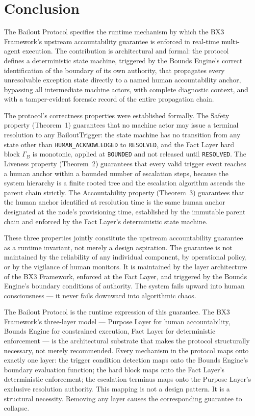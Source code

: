 \section{Conclusion}\label{sec:conclusion}

The Bailout Protocol specifies the runtime mechanism by which the BX3 Framework's upstream accountability guarantee is enforced in real-time multi-agent execution. The contribution is architectural and formal: the protocol defines a deterministic state machine, triggered by the Bounds Engine's correct identification of the boundary of its own authority, that propagates every unresolvable exception state directly to a named human accountability anchor, bypassing all intermediate machine actors, with complete diagnostic context, and with a tamper-evident forensic record of the entire propagation chain.

The protocol's correctness properties were established formally. The Safety property (Theorem~1) guarantees that no machine actor may issue a terminal resolution to any BailoutTrigger: the state machine has no transition from any state other than \texttt{HUMAN\_ACKNOWLEDGED} to \texttt{RESOLVED}, and the Fact Layer hard block $\Gamma_B$ is monotonic, applied at \texttt{BOUNDED} and not released until \texttt{RESOLVED}. The Liveness property (Theorem~2) guarantees that every valid trigger event reaches a human anchor within a bounded number of escalation steps, because the system hierarchy is a finite rooted tree and the escalation algorithm ascends the parent chain strictly. The Accountability property (Theorem~3) guarantees that the human anchor identified at resolution time is the same human anchor designated at the node's provisioning time, established by the immutable parent chain and enforced by the Fact Layer's deterministic state machine.

These three properties jointly constitute the upstream accountability guarantee as a runtime invariant, not merely a design aspiration. The guarantee is not maintained by the reliability of any individual component, by operational policy, or by the vigilance of human monitors. It is maintained by the layer architecture of the BX3 Framework, enforced at the Fact Layer, and triggered by the Bounds Engine's boundary conditions of authority. The system fails upward into human consciousness --- it never fails downward into algorithmic chaos.

The Bailout Protocol is the runtime expression of this guarantee. The BX3 Framework's three-layer model --- Purpose Layer for human accountability, Bounds Engine for constrained execution, Fact Layer for deterministic enforcement --- is the architectural substrate that makes the protocol structurally necessary, not merely recommended. Every mechanism in the protocol maps onto exactly one layer: the trigger condition detection maps onto the Bounds Engine's boundary evaluation function; the hard block maps onto the Fact Layer's deterministic enforcement; the escalation terminus maps onto the Purpose Layer's exclusive resolution authority. This mapping is not a design pattern. It is a structural necessity. Removing any layer causes the corresponding guarantee to collapse.

